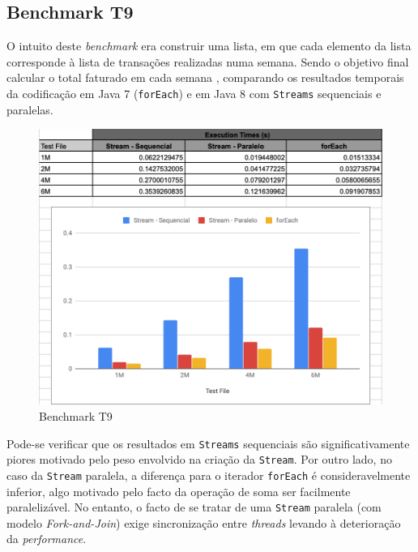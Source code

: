 \documentclass{article}
\begin{document}
\subsection{Benchmark T9}
O intuito deste \textit{benchmark} era construir uma lista, em que cada elemento da lista corresponde à lista de transações realizadas numa semana. Sendo o objetivo final calcular o total faturado em cada semana , comparando os resultados temporais da codificação em Java 7 (\texttt{forEach}) e em Java 8 com \texttt{Streams} sequenciais e paralelas.
\begin{figure}[H]
    \centering
    \includegraphics[width=15cm]{Pictures/T9.png}
    \caption{Benchmark T9}
\end{figure}
Pode-se verificar que os resultados em \texttt{Streams} sequenciais são significativamente piores motivado pelo peso envolvido na criação da \texttt{Stream}. Por 
outro lado, no caso da \texttt{Stream} paralela, a diferença para o iterador \texttt{forEach} é consideravelmente inferior, algo motivado pelo facto da operação de 
soma ser facilmente paralelizável. No entanto, o facto de se tratar de uma \texttt{Stream} paralela (com modelo \textit{Fork-and-Join}) exige sincronização entre 
\textit{threads} levando à deterioração da \textit{performance}.

\newpage
\end{document}
